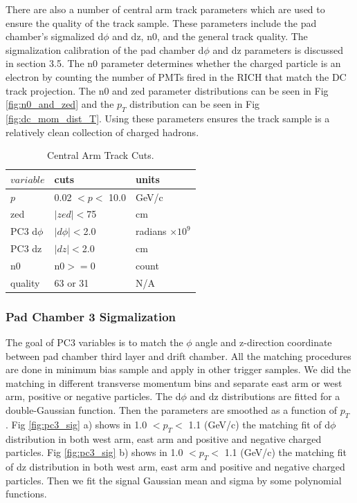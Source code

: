 There are also a number of central arm track parameters which are used to ensure the quality of the track sample. These parameters include the pad chamber's sigmalized d$\phi$ and dz, n0, and the general track quality.  The sigmalization calibration of the pad chamber d$\phi$ and dz parameters is discussed in section 3.5. The n0 parameter determines whether the charged particle is an electron by counting the number of PMTs fired in the RICH that match the DC track projection.  The n0 and zed parameter distributions can be seen in Fig \ref{fig:n0_and_zed} and the $p_T$ distribution can be seen in Fig \ref{fig:dc_mom_dist_T}. Using these parameters ensures the track sample is a relatively clean collection of charged hadrons.

\begin{table}[h!]
\caption{Central Arm Track Cuts.}
\begin{center}
    \begin{tabular}{| l | l | l | }
    \hline
    $variable$ & cuts  & units\\ \hline
    $p$ & 0.02 $< p < $ 10.0  & GeV/c\\ \hline
    zed & $|zed| <$75  & cm \\ \hline
    PC3 d$\phi$ & $|d\phi|<$2.0  & radians $\times10^{9}$ \\ \hline
    PC3 dz & $|dz|<$2.0 & cm \\ \hline
    n0 & n0$>=$0 & count \\ \hline
    quality & 63 or 31& N/A \\ \hline
    \end{tabular}
\end{center}
\end{table}

\subsubsection{Pad Chamber 3 Sigmalization}
The goal of PC3 variables is to match the $\phi$ angle and z-direction coordinate between pad chamber third layer and
drift chamber. All the matching procedures are done in minimum bias sample and
apply in other trigger samples.
We did the matching in different transverse momentum bins and separate east
arm or west arm, positive or negative particles. The d$\phi$ and dz distributions
are fitted for a double-Gaussian function. Then the parameters are smoothed as
a function of $p_T$ . Fig \ref{fig:pc3_sig} a) shows in 1.0 $< p_T <$ 1.1 (GeV/c) the matching fit of
d$\phi$ distribution in both west arm, east arm and positive and negative charged
particles. Fig \ref{fig:pc3_sig} b) shows in 1.0 $< p_T <$ 1.1 (GeV/c) the matching fit of dz distribution
in both west arm, east arm and positive and negative charged particles.
Then we fit the signal Gaussian mean and sigma by some polynomial functions.

